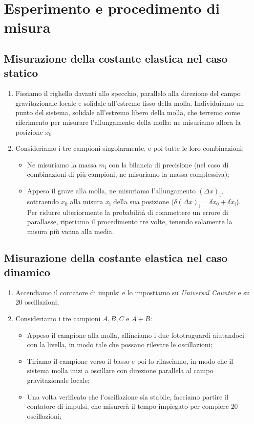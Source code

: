 \documentclass{article}
\begin{document}
\section{Esperimento e procedimento di misura}
\subsection{Misurazione della costante elastica nel caso statico}
\begin{enumerate}
    \item Fissiamo il righello davanti allo specchio, parallelo alla direzione del campo gravitazionale locale e solidale all’estremo fisso della molla. Individuiamo un punto del sistema, solidale all’estremo libero della molla, che terremo come riferimento per misurare l’allungamento della molla: ne misuriamo allora la posizione $x_\text{0}$
    \item Consideriamo i tre campioni singolarmente, e poi tutte le loro combinazioni:
    \begin{itemize}
        \item Ne misuriamo la massa $m_\text{i}$ con la bilancia di precisione
        (nel caso di combinazioni di più campioni, ne misuriamo la massa complessiva);
        \item Appeso il grave alla molla, ne misuriamo l'allungamento $(\Delta x)_\text{i}$, sottraendo $x_\text{0}$ alla misura $x_\text{i}$ della sua posizione ($\delta (\Delta x)_\text{i} = \delta  x_\text{0} + \delta  x_\text{i}$). Per ridurre ulteriormente la probabilità di commettere un errore di parallasse, ripetiamo il procedimento tre volte, tenendo solamente la misura più vicina alla media.
    \end{itemize}
\end{enumerate}
\subsection{Misurazione della costante elastica nel caso dinamico}
\begin{enumerate}
    \item Accendiamo il contatore di impulsi e lo impostiamo su \emph{Universal Counter} e su 20 oscillazioni;
    \item Consideriamo i tre campioni $A, B, C$ e $A+B$:
    \begin{itemize}
        \item Appeso il campione alla molla, allineiamo i due fototraguardi aiutandoci con la livella, in modo tale che possano rilevare le oscillazioni;
        \item Tiriamo il campione verso il basso e poi lo rilasciamo, in modo che il sistema molla inizi a oscillare con direzione parallela al campo gravitazionale locale;
        \item Una volta verificato che l’oscillazione sia stabile, facciamo partire il contatore di impulsi, che misurerà il tempo impiegato per compiere 20 oscillazioni;
    \end{itemize}
\end{enumerate}
\end{document}
